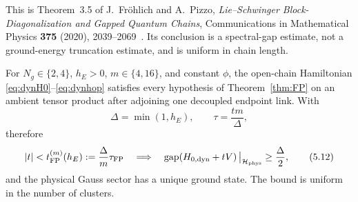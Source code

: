 This is Theorem~3.5 of
J.~Fröhlich and A.~Pizzo,
\emph{Lie--Schwinger Block-Diagonalization and Gapped Quantum Chains},
Communications in Mathematical Physics \textbf{375} (2020),
2039--2069~\cite{FP2020}.  Its conclusion is a spectral-gap estimate,
not a ground-energy truncation estimate, and is uniform in chain
length.

\begin{proposition}
\label{prop:FPaudit}
For $N_g\in\{2,4\}$, $h_E>0$, $m\in\{4,16\}$, and constant $\phi$, the
open-chain Hamiltonian \eqref{eq:dynH0}--\eqref{eq:dynhop} satisfies
every hypothesis of Theorem~\ref{thm:FP} on an ambient tensor product
after adjoining one decoupled endpoint link.  With
\[
 \Delta=\min(1,h_E),\qquad
 \tau=\frac{tm}{\Delta},
\tag{5.11}\label{eq:FPscale}
\]
therefore
\[
 |t|<t_{\rm FP}^{(m)}(h_E)
 :=\frac{\Delta}{m}\tau_{\rm FP}
 \quad\Longrightarrow\quad
 \operatorname{gap}\!\left(
 H_{0,\mathrm{dyn}}+tV
 \right)\big|_{\mathcal H_{\rm phys}}
 \geq\frac{\Delta}{2},
\tag{5.12}\label{eq:FPwindow}
\]
and the physical Gauss sector has a unique ground state.  The bound is
uniform in the number of clusters.
\end{proposition}

